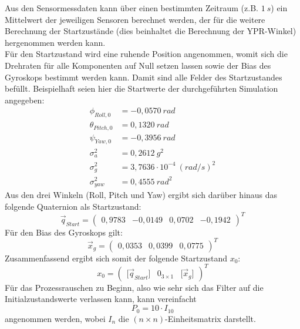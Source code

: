 \documentclass[12pt,a4paper]{article}
\begin{document}
		Aus den Sensormessdaten kann über einen bestimmten Zeitraum (z.B. $1~s$) ein Mittelwert der jeweiligen Sensoren berechnet werden, der für die weitere Berechnung der Startzustände (dies beinhaltet die Berechnung der YPR-Winkel) hergenommen werden kann.\\
		Für den Startzustand wird eine ruhende Position angenommen, womit sich die Drehraten für alle Komponenten auf Null setzen lassen sowie der Bias des Gyroskops bestimmt werden kann. Damit sind alle Felder des Startzustandes befüllt. Beispielhaft seien hier die Startwerte der durchgeführten Simulation angegeben:
		\begin{align}
			\phi_{Roll,0}&=-0,0570~rad\\
			\theta_{Pitch,0}&=0,1320~rad\\
			\psi_{Yaw,0}&=-0,3956~rad\\
			\sigma_{a}^{2}&=0,2612~g^{2}\\
			\sigma_{g}^{2}&=3,7636\cdot 10^{-4}~(rad/s)^{2}\\
			\sigma_{yaw}^{2}&=0,4555~rad^{2}
		\end{align}
		Aus den drei Winkeln (Roll, Pitch und Yaw) ergibt sich darüber hinaus das folgende Quaternion als Startzustand:
		\begin{equation}
			\vec{q}_{Start}=\begin{pmatrix}
			0,9783 & -0,0149 & 0,0702 & -0,1942
			\end{pmatrix}^{T}	
		\end{equation}
		Für den Bias des Gyroskops gilt:
		\begin{equation}
			\vec{x}_{g}=\begin{pmatrix}
			0,0353 & 0,0399 & 0,0775
			\end{pmatrix}^{T}
		\end{equation}
		Zusammenfassend ergibt sich somit der folgende Startzustand $x_{0}$:
		\begin{equation}
			x_{0}=\begin{pmatrix}
			\big[\vec{q}_{Start}\big]& 0_{3\times 1} & \big[\vec{x}_{g}\big]
			\end{pmatrix}^{T}
		\end{equation}
		Für das Prozessrauschen zu Beginn, also wie sehr sich das Filter auf die Initialzustandswerte verlassen kann, kann vereinfacht
		\begin{equation}
			P_{0}=10\cdot I_{10}
		\end{equation}
		angenommen werden, wobei $I_{n}$ die $(n\times n)$-Einheitsmatrix darstellt.
\end{document}
